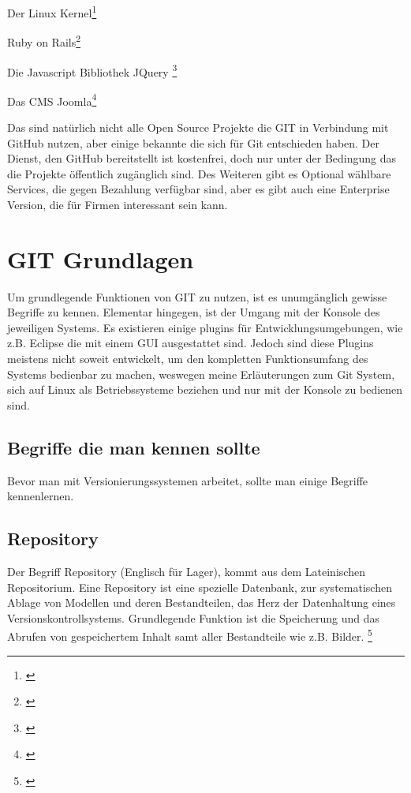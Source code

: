\documentclass[12pt,a4paper,bibliography=totocnumbered,listof=totocnumbered]{scrartcl}
\begin{document}
\begin{compactitem}
	\item Der Linux Kernel\footnote{\cite{linux}}
	\item Ruby on Rails\footnote{\cite{ruby}}
	\item Die Javascript Bibliothek JQuery \footnote{\cite{jquery}}
	\item Das CMS Joomla\footnote{\cite{joomla}}
\end{compactitem}

Das sind natürlich nicht alle Open Source Projekte die GIT in Verbindung mit GitHub nutzen, aber einige bekannte die sich für Git entschieden haben. Der Dienst, den GitHub bereitstellt ist kostenfrei, doch nur unter der Bedingung das die Projekte öffentlich zugänglich sind. Des Weiteren gibt es Optional wählbare Services, die gegen Bezahlung verfügbar sind, aber es gibt auch eine Enterprise Version, die für Firmen interessant sein kann.    
\pagebreak

\section{GIT Grundlagen}
Um grundlegende Funktionen von GIT zu nutzen, ist es unumgänglich gewisse Begriffe zu kennen. Elementar hingegen, ist der Umgang mit der Konsole des jeweiligen Systems. Es existieren einige plugins für Entwicklungsumgebungen, wie z.B. Eclipse die mit einem GUI ausgestattet sind. Jedoch sind diese Plugins meistens nicht soweit entwickelt, um den kompletten Funktionsumfang des Systems bedienbar zu machen,
weswegen meine Erläuterungen zum Git System, sich auf Linux als Betriebssysteme beziehen und nur mit der Konsole zu bedienen sind.     

\subsection{Begriffe die man kennen sollte}
Bevor man mit Versionierungssystemen arbeitet, sollte man einige Begriffe kennenlernen. 
\subsection{Repository}
Der Begriff Repository (Englisch für Lager), kommt aus dem Lateinischen Repositorium.
Eine Repository ist eine spezielle Datenbank, zur systematischen Ablage von Modellen und deren Bestandteilen, das Herz der Datenhaltung eines Versionskontrollsystems. Grundlegende Funktion ist die Speicherung und das Abrufen von gespeichertem Inhalt samt aller Bestandteile wie z.B. Bilder. \footnote{\cite{Leymann}} 
\end{document}
